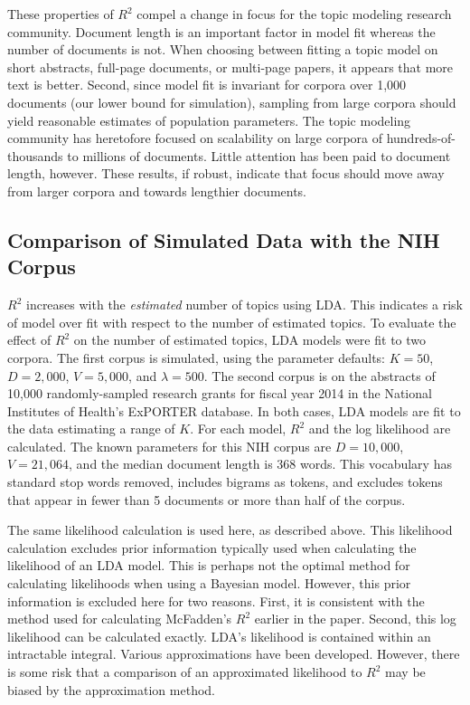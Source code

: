 \documentclass[conference,final,]{IEEEtran}
\begin{document}
These properties of \(R^2\) compel a change in focus for the topic
modeling research community. Document length is an important factor in
model fit whereas the number of documents is not. When choosing between
fitting a topic model on short abstracts, full-page documents, or
multi-page papers, it appears that more text is better. Second, since
model fit is invariant for corpora over 1,000 documents (our lower bound
for simulation), sampling from large corpora should yield reasonable
estimates of population parameters. The topic modeling community has
heretofore focused on scalability on large corpora of
hundreds-of-thousands to millions of documents. Little attention has
been paid to document length, however. These results, if robust,
indicate that focus should move away from larger corpora and towards
lengthier documents.

\hypertarget{comparison-of-simulated-data-with-the-nih-corpus}{%
\subsection{Comparison of Simulated Data with the NIH
Corpus}\label{comparison-of-simulated-data-with-the-nih-corpus}}

\(R^2\) increases with the \textit{estimated} number of topics using
LDA. This indicates a risk of model over fit with respect to the number
of estimated topics. To evaluate the effect of \(R^2\) on the number of
estimated topics, LDA models were fit to two corpora. The first corpus
is simulated, using the parameter defaults: \(K = 50\), \(D = 2,000\),
\(V = 5,000\), and \(\lambda = 500\). The second corpus is on the
abstracts of 10,000 randomly-sampled research grants for fiscal year
2014 in the National Institutes of Health's ExPORTER database. In both
cases, LDA models are fit to the data estimating a range of \(K\). For
each model, \(R^2\) and the log likelihood are calculated. The known
parameters for this NIH corpus are \(D = 10,000\), \(V = 21,064\), and
the median document length is 368 words. This vocabulary has standard
stop words removed, includes bigrams as tokens, and excludes tokens that
appear in fewer than 5 documents or more than half of the corpus.

The same likelihood calculation is used here, as described above. This
likelihood calculation excludes prior information typically used when
calculating the likelihood of an LDA model. This is perhaps not the
optimal method for calculating likelihoods when using a Bayesian model.
However, this prior information is excluded here for two reasons. First,
it is consistent with the method used for calculating McFadden's \(R^2\)
earlier in the paper. Second, this log likelihood can be calculated
exactly. LDA's likelihood is contained within an intractable integral.
Various approximations have been developed. However, there is some risk
that a comparison of an approximated likelihood to \(R^2\) may be biased
by the approximation method.
\end{document}
